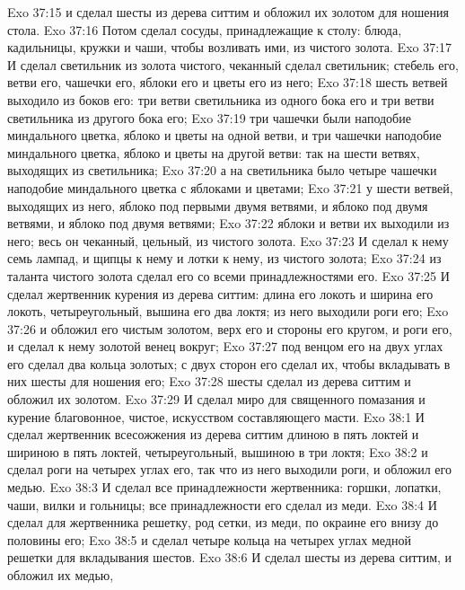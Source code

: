 \vs Exo 37:15 и сделал шесты из дерева ситтим и обложил их золотом для ношения стола.
\vs Exo 37:16 Потом сделал сосуды, принадлежащие к столу: блюда, кадильницы, кружки и чаши, чтобы возливать ими, из чистого золота.
\rsbpar\vs Exo 37:17 И сделал светильник из золота чистого, чеканный сделал светильник; стебель его, ветви его, чашечки его, яблоки его и цветы его  из него;
\vs Exo 37:18 шесть ветвей выходило из боков его: три ветви светильника из одного бока его и три ветви светильника из другого бока его;
\vs Exo 37:19 три чашечки были наподобие миндального цветка, яблоко и цветы на одной ветви, и три чашечки наподобие миндального цветка, яблоко и цветы на другой ветви: так на  шести ветвях, выходящих из светильника;
\vs Exo 37:20 а на  светильника было четыре чашечки наподобие миндального цветка с яблоками и цветами;
\vs Exo 37:21 у шести ветвей, выходящих из него, яблоко под первыми двумя ветвями, и яблоко под  двумя ветвями, и яблоко под  двумя ветвями;
\vs Exo 37:22 яблоки и ветви их выходили из него; весь он  чеканный, цельный, из чистого золота.
\vs Exo 37:23 И сделал к нему семь лампад, и щипцы к нему и лотки к нему, из чистого золота;
\vs Exo 37:24 из таланта чистого золота сделал его со всеми принадлежностями его.
\rsbpar\vs Exo 37:25 И сделал жертвенник курения из дерева ситтим: длина его локоть и ширина его локоть, четыреугольный, вышина его два локтя; из него выходили роги его;
\vs Exo 37:26 и обложил его чистым золотом, верх его и стороны его кругом, и роги его, и сделал к нему золотой венец вокруг;
\vs Exo 37:27 под венцом его на двух углах его сделал два кольца золотых; с двух сторон его сделал их, чтобы вкладывать в них шесты для ношения его;
\vs Exo 37:28 шесты сделал из дерева ситтим и обложил их золотом.
\vs Exo 37:29 И сделал миро для священного помазания и курение благовонное, чистое, искусством составляющего масти.
\vs Exo 38:1 И сделал жертвенник всесожжения из дерева ситтим длиною в пять локтей и шириною в пять локтей, четыреугольный, вышиною в три локтя;
\vs Exo 38:2 и сделал роги на четырех углах его, так что из него выходили роги, и обложил его медью.
\vs Exo 38:3 И сделал все принадлежности жертвенника: горшки, лопатки, чаши, вилки и гольницы; все принадлежности его сделал из меди.
\vs Exo 38:4 И сделал для жертвенника решетку, род сетки, из меди, по окраине его внизу до половины его;
\vs Exo 38:5 и сделал четыре кольца на четырех углах медной решетки для вкладывания шестов.
\vs Exo 38:6 И сделал шесты из дерева ситтим, и обложил их медью,
